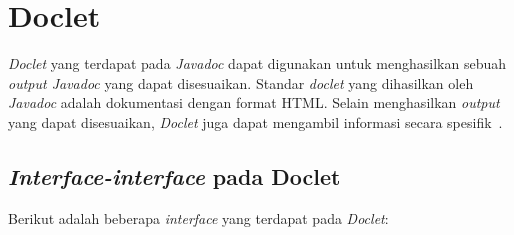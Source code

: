 \section{Doclet}
\label{sec:doclet}
{\it Doclet} yang terdapat pada {\it Javadoc} dapat digunakan untuk menghasilkan sebuah {\it output Javadoc} yang dapat disesuaikan. Standar {\it doclet} yang dihasilkan oleh {\it Javadoc} adalah dokumentasi dengan format HTML. Selain menghasilkan {\it output} yang dapat disesuaikan, {\it Doclet} juga dapat mengambil informasi secara spesifik~\cite{doclet:02:doclet}.

\subsection{\textit{Interface-interface} pada Doclet}
\label{sec:interface-doclet}
Berikut adalah beberapa {\it interface} yang terdapat pada {\it Doclet}:
